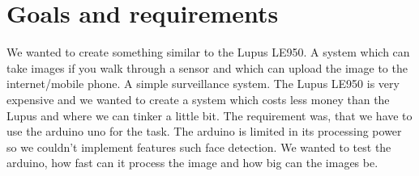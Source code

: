 \section[Goals and requirements]{Goals and requirements}
We wanted to create something similar to the Lupus LE950. A system which can take images if you walk through a sensor and which can upload the image to the internet/mobile phone. A simple surveillance system. The Lupus LE950 is very expensive and we wanted to create a system which costs less money than the Lupus and where we can tinker a little bit. The requirement was, that we have to use the arduino uno for the task. The arduino is limited in its processing power so we couldn’t implement features such face detection. We wanted to test the arduino, how fast can it process the image and how big can the images be. 
